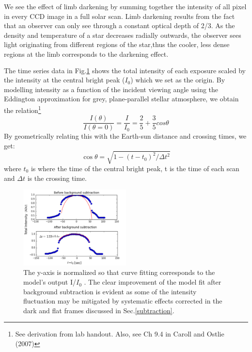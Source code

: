 \documentclass[authoryear, 12pt,5p, times]{elsarticle}
\begin{document}
We see the effect of limb darkening by summing together the intensity of all pixel in every CCD image in a full solar scan. Limb darkening results from the fact that an observer can only see through a constant optical depth of 2/3. As the density and temperature of a star decreases radially outwards, the observer sees light originating from different regions of the star,thus the cooler, less dense regions at the limb corresponds to the darkening effect. 

The time series data in Fig.\ref{eddington_fit} shows the total intensity of each exposure scaled by the intensity at the central bright peak ($I_0$) which we set as the origin. By modelling intensity as a function of the incident viewing angle using the Eddington approximation for grey, plane-parallel stellar atmosphere, we obtain the relation\footnote{See derivation from lab handout. Also, see Ch 9.4 in Caroll and Ostlie (2007)} 
\begin{equation}
\frac{I(\theta)}{I(\theta=0)}=\frac{I}{I_0}= \frac{2}{5}+\frac{3}{5}cos\theta
\label{eddington_eq}
\end{equation}
By geometrically relating this with the Earth-sun distance and crossing times, we get: 
\begin{equation}
\cos \theta = \sqrt{1-(t-t_0)^2/\Delta t^2} 
\end{equation}
where $t_0$ is where the time of the central bright peak, t is the time of each scan and $\Delta t$ is the crossing time.


\begin{figure}[h!]
\includegraphics[width=0.5\textwidth]{figures/eddington_fit}
\caption{ The y-axis is normalized so that curve fitting corresponds to the model's output I/$I_0$ . The clear improvement of the model fit after background subtraction is evident as some of the intensity fluctuation may be mitigated by systematic effects corrected in the dark and flat frames discussed in Sec.\ref{subtraction}.}
\label{eddington_fit}
\end{figure}
\end{document}
